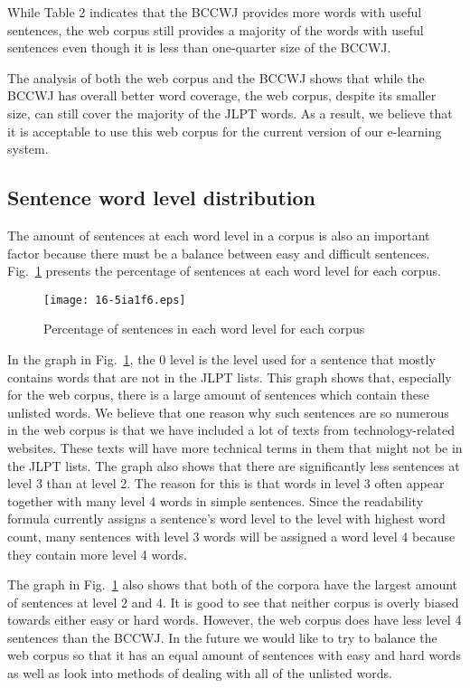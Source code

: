 \documentclass[english]{jnlp_1.4}
\begin{document}
While Table 2 indicates that the BCCWJ provides more words with useful sentences, the web corpus still provides a majority of the words with useful sentences even though it is less than one-quarter size of the BCCWJ.

The analysis of both the web corpus and the BCCWJ shows that while the BCCWJ has overall better word coverage, the web corpus, despite its smaller size, can still cover the majority of the JLPT words. As a result, we believe that it is acceptable to use this web corpus for the current version of our e-learning system.


\subsection{Sentence word level distribution}

The amount of sentences at each word level in a corpus is also an important factor because there must be a balance between easy and difficult sentences. Fig.~\ref{fig6} presents the percentage of sentences at each word level for each corpus.

\begin{figure}[t]
\begin{center}
  \texttt{[image: 16-5ia1f6.eps]}
\end{center}
  \caption{Percentage of sentences in each word level for each corpus}
  \label{fig6}
\end{figure}

In the graph in Fig.~\ref{fig6}, the 0 level is the level used for a sentence that mostly contains words that are not in the JLPT lists. This graph shows that, especially for the web corpus, there is a large amount of sentences which contain these unlisted words. We believe that one reason why such sentences are so numerous in the web corpus is that we have included a lot of texts from technology-related websites. These texts will have more technical terms in them that might not be in the JLPT lists. The graph also shows that there are significantly less sentences at level 3 than at level 2. The reason for this is that words in level 3 often appear together with many level 4 words in simple sentences. Since the readability formula currently assigns a sentence's word level to the level with highest word count, many sentences with level 3 words will be assigned a word level 4 because they contain more level 4 words.

The graph in Fig.~\ref{fig6} also shows that both of the corpora have the largest amount of sentences at level 2 and 4. It is good to see that neither corpus is overly biased towards either easy or hard words. However, the web corpus does have less level 4 sentences than the BCCWJ. In the future we would like to try to balance the web corpus so that it has an equal amount of sentences with easy and hard words as well as look into methods of dealing with all of the unlisted words.
\end{document}
